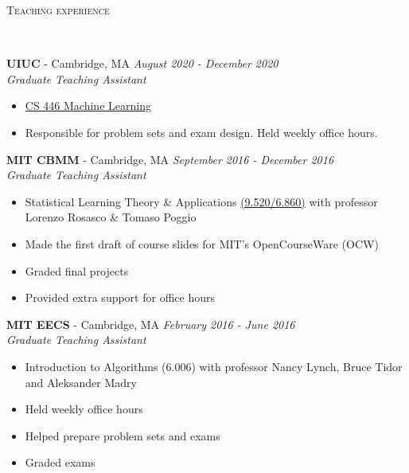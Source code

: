 \documentclass{article}
\newenvironment{changemargin}[2]{%
  \begin{list}{}{%
    \setlength{\topsep}{0pt}%
    \setlength{\leftmargin}{#1}%
    \setlength{\rightmargin}{#2}%
    \setlength{\listparindent}{\parindent}%
    \setlength{\itemindent}{\parindent}%
    \setlength{\parsep}{\parskip}%
  }%
  \item[]}{\end{list}
}
\newcommand{\lineover}{
	\begin{changemargin}{-0.05in}{-0.05in}
		\vspace*{-8pt}
		\hrulefill \\
		\vspace*{-2pt}
	\end{changemargin}
}
\newcommand{\header}[1]{
	\begin{changemargin}{-0.5in}{-0.5in}
		\scshape{#1}\\
  	\lineover
	\end{changemargin}
}
\newenvironment{body} {
	\vspace*{-16pt}
	\begin{changemargin}{-0.25in}{-0.5in}
  }	
	{\end{changemargin}
}
\begin{document}
\header{Teaching experience}
\begin{body}
	\vspace{16pt}
	
	\textbf{UIUC} - Cambridge, MA \hfill \emph{August 2020 - December 2020}\\
	\emph{Graduate Teaching Assistant}\\
	\vspace*{-3pt}
	\begin{itemize} \itemsep -2pt
		\item \href{https://relate.cs.illinois.edu/course/CS446-fa20/}{CS 446 Machine Learning}
		\item Responsible for problem sets and exam design. Held weekly office hours.
	\end{itemize}
    
    \textbf{MIT CBMM} - Cambridge, MA \hfill \emph{September 2016 - December 2016}\\
	\emph{Graduate Teaching Assistant}\\
	\vspace*{-3pt}
	\begin{itemize} \itemsep -2pt
		\item Statistical Learning Theory \& Applications \href{http://www.mit.edu/~9.520/fall16/}{(9.520/6.860)} with professor Lorenzo Rosasco \& Tomaso Poggio
        \item Made the first draft of course slides for MIT's OpenCourseWare (OCW)
        \item Graded final projects
        \item Provided extra support for office hours
	\end{itemize}

   	\textbf{MIT EECS} - Cambridge, MA \hfill \emph{February 2016 - June 2016}\\
	\emph{Graduate Teaching Assistant}\\
	\vspace*{-3pt}
	\begin{itemize} \itemsep -2pt
        \item Introduction to Algorithms (6.006) with professor Nancy Lynch, Bruce Tidor and Aleksander Madry
        \item Held weekly office hours 
        \item Helped prepare problem sets and exams
        \item Graded exams
	\end{itemize}
    

\end{body}
\end{document}
